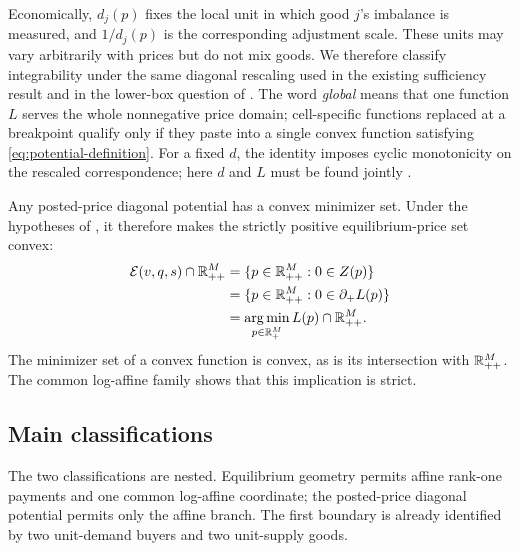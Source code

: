Economically, $d_j(p)$ fixes the local unit in which good $j$'s imbalance is measured, and $1/d_j(p)$ is the corresponding adjustment scale. These units may vary arbitrarily with prices but do not mix goods. We therefore classify integrability under the same diagonal rescaling used in the existing sufficiency result and in the lower-box question of . The word \emph{global} means that one function $L$ serves the whole nonnegative price domain; cell-specific functions replaced at a breakpoint qualify only if they paste into a single convex function satisfying \eqref{eq:potential-definition}. For a fixed $d$, the identity imposes cyclic monotonicity on the rescaled correspondence; here $d$ and $L$ must be found jointly \citep{rockafellar1966}.

Any posted-price diagonal potential has a convex minimizer set. Under the hypotheses of , it therefore makes the strictly positive equilibrium-price set convex:
\begin{equation}\label{eq:argmin-equilibrium}
\begin{aligned}
\mathcal{E}(v,q,s)\cap\mathbb{R}_{++}^M
&=\{p\in\mathbb{R}_{++}^M:0\in Z(p)\}\\
&=\{p\in\mathbb{R}_{++}^M:0\in\partial_+L(p)\}\\
&=\operatorname*{arg\,min}_{p\in\mathbb{R}_+^M}L(p)\cap\mathbb{R}_{++}^M.
\end{aligned}
\end{equation}
The minimizer set of a convex function is convex, as is its intersection with $\mathbb{R}_{++}^M$. The common log-affine family shows that this implication is strict.

\subsection{Main classifications}\label{subsec:main-results}

The two classifications are nested. Equilibrium geometry permits affine rank-one payments and one common log-affine coordinate; the posted-price diagonal potential permits only the affine branch. The first boundary is already identified by two unit-demand buyers and two unit-supply goods.

